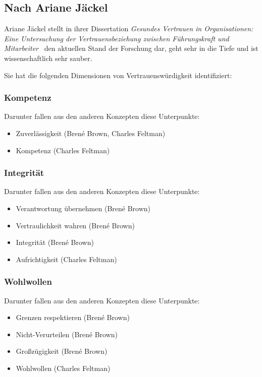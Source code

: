 \subsection{Nach Ariane Jäckel}

Ariane Jäckel stellt in ihrer Dissertation \emph{Gesundes Vertrauen in Organisationen: Eine Untersuchung der Vertrauensbeziehung zwischen Führungskraft und Mitarbeiter}~\cite{gesundes-vertrauen-in-organisationen} den aktuellen Stand der Forschung dar, geht sehr in die Tiefe und ist wissenschaftlich sehr sauber.

Sie hat die folgenden Dimensionen von Vertrauenswürdigkeit identifiziert:


\subsubsection{Kompetenz}

Darunter fallen aus den anderen Konzepten diese Unterpunkte:

\begin{itemize}
  \item Zuverlässigkeit (Brené Brown, Charles Feltman)
  \item Kompetenz (Charles Feltman)
\end{itemize}


\subsubsection{Integrität}

Darunter fallen aus den anderen Konzepten diese Unterpunkte:

\begin{itemize}
  \item Verantwortung übernehmen (Brené Brown)
  \item Vertraulichkeit wahren (Brené Brown)
  \item Integrität (Brené Brown)
  \item Aufrichtigkeit (Charles Feltman)
\end{itemize}


\subsubsection{Wohlwollen}

Darunter fallen aus den anderen Konzepten diese Unterpunkte:

\begin{itemize}
  \item Grenzen respektieren (Brené Brown)
  \item Nicht-Verurteilen (Brené Brown)
  \item Großzügigkeit (Brené Brown)
  \item Wohlwollen (Charles Feltman)
\end{itemize}
